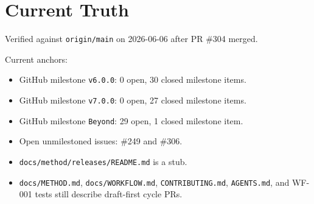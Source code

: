 \section{Current Truth}\label{record-212-current-truth}

Verified against \texttt{o\allowbreak{}r\allowbreak{}i\allowbreak{}g\allowbreak{}i\allowbreak{}n\allowbreak{}/\allowbreak{}m\allowbreak{}a\allowbreak{}i\allowbreak{}n} on 2026-06-06 after PR \#304 merged.

Current anchors:

\begin{itemize}
\tightlist
\item
  GitHub milestone \texttt{v\allowbreak{}6\allowbreak{}.\allowbreak{}0\allowbreak{}.\allowbreak{}0}: 0 open, 30 closed milestone items.
\item
  GitHub milestone \texttt{v\allowbreak{}7\allowbreak{}.\allowbreak{}0\allowbreak{}.\allowbreak{}0}: 0 open, 27 closed milestone items.
\item
  GitHub milestone \texttt{B\allowbreak{}e\allowbreak{}y\allowbreak{}o\allowbreak{}n\allowbreak{}d}: 29 open, 1 closed milestone item.
\item
  Open unmilestoned issues: \#249 and \#306.
\item
  \texttt{d\allowbreak{}o\allowbreak{}c\allowbreak{}s\allowbreak{}/\allowbreak{}m\allowbreak{}e\allowbreak{}t\allowbreak{}h\allowbreak{}o\allowbreak{}d\allowbreak{}/\allowbreak{}r\allowbreak{}e\allowbreak{}l\allowbreak{}e\allowbreak{}a\allowbreak{}s\allowbreak{}e\allowbreak{}s\allowbreak{}/\allowbreak{}R\allowbreak{}E\allowbreak{}A\allowbreak{}D\allowbreak{}M\allowbreak{}E\allowbreak{}.\allowbreak{}m\allowbreak{}d} is a stub.
\item
  \texttt{d\allowbreak{}o\allowbreak{}c\allowbreak{}s\allowbreak{}/\allowbreak{}M\allowbreak{}E\allowbreak{}T\allowbreak{}H\allowbreak{}O\allowbreak{}D\allowbreak{}.\allowbreak{}m\allowbreak{}d}, \texttt{d\allowbreak{}o\allowbreak{}c\allowbreak{}s\allowbreak{}/\allowbreak{}W\allowbreak{}O\allowbreak{}R\allowbreak{}K\allowbreak{}F\allowbreak{}L\allowbreak{}O\allowbreak{}W\allowbreak{}.\allowbreak{}m\allowbreak{}d}, \texttt{C\allowbreak{}O\allowbreak{}N\allowbreak{}T\allowbreak{}R\allowbreak{}I\allowbreak{}B\allowbreak{}U\allowbreak{}T\allowbreak{}I\allowbreak{}N\allowbreak{}G\allowbreak{}.\allowbreak{}m\allowbreak{}d}, \texttt{A\allowbreak{}G\allowbreak{}E\allowbreak{}N\allowbreak{}T\allowbreak{}S\allowbreak{}.\allowbreak{}m\allowbreak{}d}, and WF-001 tests still describe draft-first cycle PRs.
\end{itemize}

